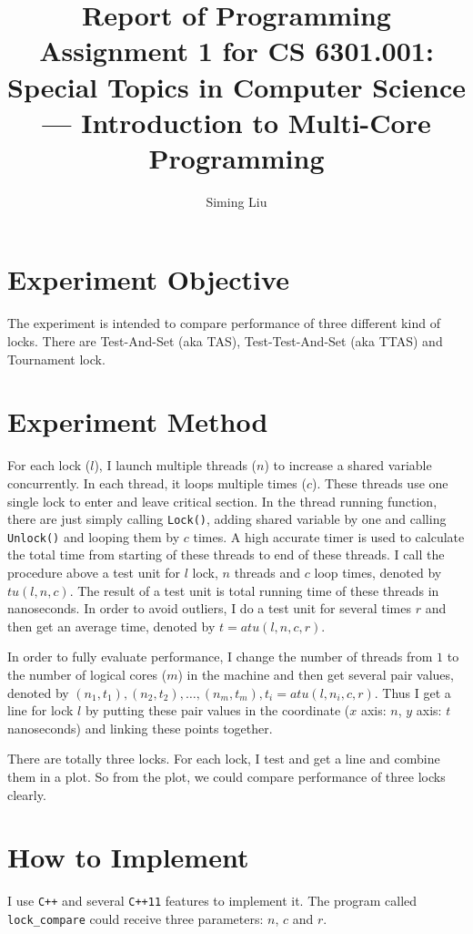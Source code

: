 \documentclass[a4paper]{report}
\begin{document}
\title{Report of Programming Assignment 1 for CS 6301.001: Special Topics in Computer Science --- Introduction to Multi-Core Programming}

\author{Siming Liu}

\maketitle{}

\section*{Experiment Objective}
The experiment is intended to compare performance of three different kind of locks. There are Test-And-Set (aka TAS), Test-Test-And-Set (aka TTAS) and Tournament lock.

\section*{Experiment Method}
For each lock ($l$), I launch multiple threads ($n$) to increase a shared variable concurrently.
In each thread, it loops multiple times ($c$).
These threads use one single lock to enter and leave critical section. In the thread running function, there are just simply calling \lstinline{Lock()}, adding shared variable by one and calling \lstinline{Unlock()} and looping them by $c$ times.
A high accurate timer is used to calculate the total time from starting of these threads to end of these threads.
I call the procedure above a test unit for $l$ lock, $n$ threads and $c$ loop times, denoted by $tu(l, n, c)$.
The result of a test unit is total running time of these threads in nanoseconds.
In order to avoid outliers, I do a test unit for several times $r$ and then get an average time, denoted by $t = atu(l, n, c, r)$.

In order to fully evaluate performance, I change the number of threads from $1$ to the number of logical cores ($m$) in the machine and then get several pair values, denoted by $(n_1, t_1), (n_2, t_2), \ldots, (n_m, t_m), t_i = atu(l, n_i, c, r)$. Thus I get a line for lock $l$ by putting these pair values in the coordinate ($x$ axis: $n$, $y$ axis: $t$ nanoseconds) and linking these points together.

There are totally three locks.
For each lock, I test and get a line and combine them in a plot.
So from the plot, we could compare performance of three locks clearly.

\section*{How to Implement}
I use \lstinline{C++} and several \lstinline{C++11} features to implement it.
The program called \lstinline{lock_compare} could receive three parameters: $n$, $c$ and $r$.
\end{document}
